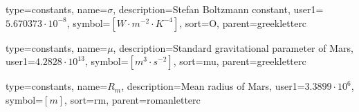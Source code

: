 {
	type=constants, %
	name={\ensuremath{\sigma}}, %
	description={Stefan Boltzmann constant}, %
	user1={$5.670373\cdot10^{-8}$}, %
	symbol={$\left[W\cdot m^{-2}\cdot K^{-4}\right]$}, %
	sort=O, %
	parent=greekletterc %
}

{
type=constants, %
name={\ensuremath{\mu}}, %
description={Standard gravitational parameter of Mars}, %
user1={$4.2828\cdot 10^{13}$}, %
symbol={$\left[m^3\cdot s^{-2}\right]$}, %
sort=mu, %
parent=greekletterc %
}

{
type=constants, %
name={\ensuremath{R_m}}, %
description={Mean radius of Mars}, %
user1={$3.3899\cdot 10^{6}$}, %
symbol={$\left[m\right]$}, %
sort=rm, %
parent=romanletterc %
}
